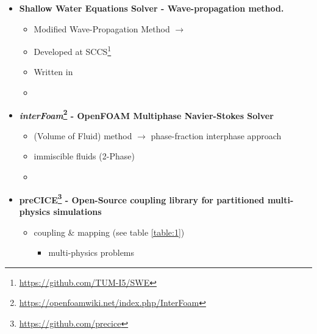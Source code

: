 
\begin{frame}

\begin{multicols}{2}
\begin{itemize}
 \setlength\itemsep{10pt}

\item<2->[]
\textbf{Shallow Water Equations Solver - {\small Wave-propagation method.}}
\begin{itemize}
\vspace{5pt}
 \setlength\itemsep{6pt}
\item Modified Wave-Propagation Method $\rightarrow$  \cite{levequeArticle}
\item Developed at SCCS\footnote{\url{https://github.com/TUM-I5/SWE}}
\item Written in 
\item {}
\end{itemize}

\item<3->[]
\textbf{\textit{interFoam}\footnote{\url{https://openfoamwiki.net/index.php/InterFoam}} - {\small OpenFOAM Multiphase Navier-Stokes Solver}}
\begin{itemize}
\vspace{5pt}
 \setlength\itemsep{6pt}
\item {} (Volume of Fluid) method $\rightarrow$ phase-fraction interphase approach 
\item immiscible fluids (2-Phase)
\item {}
\end{itemize}

\vfill\columnbreak
\item<4->[]
\textbf{preCICE\footnote{\url{https://github.com/precice}} - \small{Open-Source coupling library for partitioned multi-physics simulations}}
\begin{itemize}
\vspace{5pt}
\item coupling \& mapping {\tiny (see table \ref{table:1})}
\begin{itemize}
\item[] multi-physics  problems
\end{itemize}
\end{itemize}
\end{itemize}

\end{multicols}

\end{frame}

